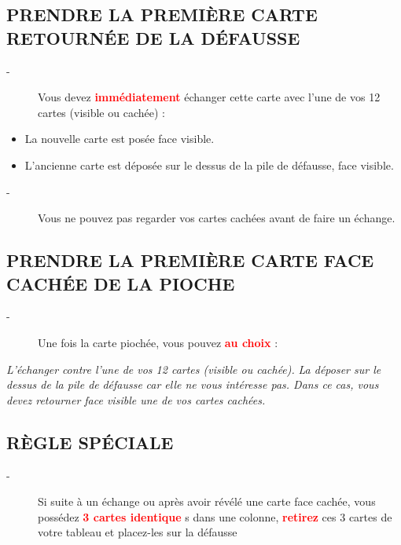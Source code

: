 \documentclass{article}%
\begin{document}
%
\subsection{ PRENDRE LA PREMIÈRE CARTE RETOURNÉE DE LA DÉFAUSSE
}%
\label{subsec:PRENDRELAPREMIRECARTERETOURNEDELADFAUSSE}%
\begin{description}%
\item[{-} ]%
%
 Vous devez %
\textcolor{red}{%
\textbf{immédiatement}%
}%
\textit{ }%
 échanger cette carte avec l’une de vos 12 cartes (visible ou cachée) :
%
\end{description}%
\begin{itemize}%
\item%
%
 La nouvelle carte est posée face visible.
%
\item%
%
 L'ancienne carte est déposée sur le dessus de la pile de défausse, face visible.
%
\end{itemize}%
\begin{description}%
\item[{-} ]%
%
 Vous ne pouvez pas regarder vos cartes cachées avant de faire un échange.
%
\end{description}

%
\subsection{ PRENDRE LA PREMIÈRE CARTE FACE CACHÉE DE LA PIOCHE
}%
\label{subsec:PRENDRELAPREMIRECARTEFACECACHEDELAPIOCHE}%
\begin{description}%
\item[{-} ]%
%
Une fois la carte piochée, vous pouvez %
\textcolor{red}{%
\textbf{au choix}%
}%
\textit{ }%
 :
%
\end{description}%
\textit{ }%
\textit{L'échanger}%
\textit{ contre l'une de vos 12 cartes (visible ou cachée).
}%
\textit{ La déposer sur le dessus de la pile de }%
\textit{défausse}%
\textit{ car elle ne vous intéresse pas. Dans ce cas, vous devez retourner face visible une de vos cartes cachées.
}

%
\subsection{ RÈGLE SPÉCIALE
}%
\label{subsec:RGLESPCIALE}%
\begin{description}%
\item[{-} ]%
%
 Si suite à un échange ou après avoir révélé une carte face cachée, vous possédez %
\textcolor{red}{%
\textbf{3 cartes identique}%
}%
s dans une colonne, %
\textcolor{red}{%
\textbf{retirez}%
}%
\textit{ }%
 ces 3 cartes de votre tableau et placez{-}les sur la défausse
%
\end{description}
\end{document}
